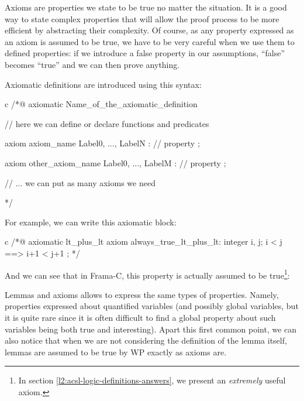 Axioms are properties we state to be true no matter the situation. It is
a good way to state complex properties that will allow the proof process
to be more efficient by abstracting their complexity. Of course, as any
property expressed as an axiom is assumed to be true, we have to be very
careful when we use them to defined properties: if we introduce a false
property in our assumptions, ``false'' becomes ``true'' and we can then
prove anything.





Axiomatic definitions are introduced using this syntax:



\begin{CodeBlock}{c}
/*@
  axiomatic Name_of_the_axiomatic_definition {
    // here we can define or declare functions and predicates

    axiom axiom_name { Label0, ..., LabelN }:
      // property ;

    axiom other_axiom_name { Label0, ..., LabelM }:
      // property ;

    // ... we can put as many axioms we need
  }
*/
\end{CodeBlock}



For example, we can write this axiomatic block:



\begin{CodeBlock}{c}
/*@
  axiomatic lt_plus_lt{
    axiom always_true_lt_plus_lt:
      \forall integer i, j; i < j ==> i+1 < j+1 ;
  }
*/
\end{CodeBlock}



And we can see that in Frama-C, this property is actually assumed to be
true\footnote{In section \ref{l2:acsl-logic-definitions-answers}, we
present an {\em extremely} useful axiom.}:










Lemmas and axioms allows to express the same types of properties.
Namely, properties expressed about quantified variables (and possibly
global variables, but it is quite rare since it is often difficult to
find a global property about such variables being both true and
interesting). Apart this first common point, we can also notice that
when we are not considering the definition of the lemma itself, lemmas
are assumed to be true by WP exactly as axioms are.




